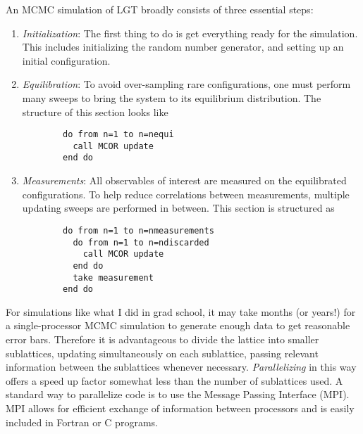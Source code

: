 An MCMC simulation of LGT broadly consists of three essential steps:
\begin{enumerate}
  \item {\it Initialization}: The first thing to do is get everything ready for
        the simulation. This includes initializing the random number generator,
        and setting up an initial configuration.
  \item {\it Equilibration}: To avoid over-sampling rare configurations, 
        one must perform many sweeps to bring the system to its equilibrium 
        distribution. The structure of this section looks like 
        \begin{verbatim}
        do from n=1 to n=nequi 
          call MCOR update
        end do
        \end{verbatim}
  \item {\it Measurements}: All observables of interest are measured on the
        equilibrated configurations. To help reduce correlations between
        measurements, multiple updating sweeps are performed in between.
        This section is structured as
        \begin{verbatim}
        do from n=1 to n=nmeasurements
          do from n=1 to n=ndiscarded
            call MCOR update
          end do
          take measurement
        end do
        \end{verbatim}
\end{enumerate}

For simulations like what I did in grad school, it may take months (or years!) 
for a single-processor MCMC simulation to
generate enough data to get reasonable error bars. Therefore it is
advantageous to divide the lattice into smaller sublattices, updating
simultaneously on each sublattice, passing relevant information between the
sublattices whenever necessary. {\it Parallelizing} in this way offers a speed
up factor somewhat less than the number of sublattices used. A standard way to
parallelize code is to use the Message Passing Interface (MPI). MPI allows
for efficient exchange of information between processors and is easily included
in Fortran or C programs.

